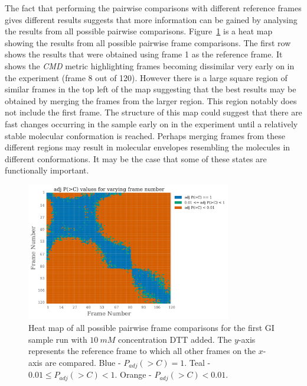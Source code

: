 The fact that performing the pairwise comparisons with different reference frames gives different results suggests that more information can be gained by analysing the results from all possible pairwise comparisons.
Figure~\ref{fig:heatmap - DTT} is a heat map showing the results from all possible pairwise frame comparisons.
The first row shows the results that were obtained using frame 1 as the reference frame.
It shows the \textit{CMD} metric highlighting frames becoming dissimilar very early on in the experiment (frame 8 out of 120).
However there is a large square region of similar frames in the top left of the map suggesting that the best results may be obtained by merging the frames from the larger region.
This region notably does not include the first frame.
The structure of this map could suggest that there are fast changes occurring in the sample early on in the experiment until a relatively stable molecular conformation is reached.
Perhaps merging frames from these different regions may result in molecular envelopes resembling the molecules in different conformations.
It may be the case that some of these states are functionally important.
\begin{figure}
    \centering
    \includegraphics[width=0.8\textwidth]{figures/saxs/dtt_heatmap.pdf}
    \caption{Heat map of all possible pairwise frame comparisons for the first GI sample run with $10\ mM$ concentration DTT added. The $y$-axis represents the reference frame to which all other frames on the $x$-axis are compared. Blue - $P_{adj}(>C) = 1$. Teal - $0.01 \le P_{adj}(>C) < 1 $. Orange - $P_{adj}(>C) < 0.01$.}
    \label{fig:heatmap - DTT}
\end{figure}

